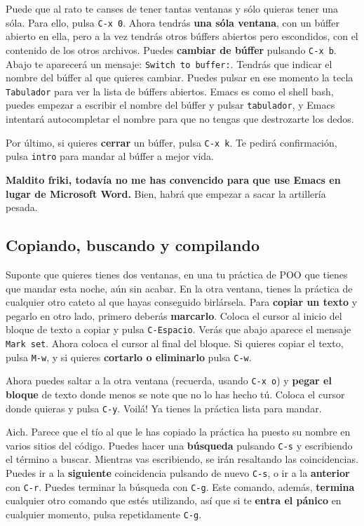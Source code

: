 \documentclass[landscape]{article}
\begin{document}
\begin{multicols*}{2}
Puede que al rato te canses de tener tantas ventanas y sólo quieras tener una sóla. Para ello, pulsa \texttt{C-x 0}. Ahora tendrás \textbf{una sóla ventana}, con un búffer abierto en ella, pero a la vez tendrás otros búffers abiertos pero escondidos, con el contenido de los otros archivos. Puedes \textbf{cambiar de búffer} pulsando \texttt{C-x b}. Abajo te aparecerá un mensaje: \texttt{Switch to buffer:}. Tendrás que indicar el nombre del búffer al que quieres cambiar. Puedes pulsar en ese momento la tecla \texttt{Tabulador} para ver la lista de búffers abiertos. Emacs es como el shell bash, puedes empezar a escribir el nombre del búffer y pulsar \texttt{tabulador}, y Emacs intentará autocompletar el nombre para que no tengas que destrozarte los dedos.

Por último, si quieres \textbf{cerrar} un búffer, pulsa \texttt{C-x k}. Te pedirá confirmación, pulsa \texttt{intro} para mandar al búffer a mejor vida.

\textbf{Maldito friki, todavía no me has convencido para que use Emacs en lugar de Microsoft Word.} Bien, habrá que empezar a sacar la artillería pesada.

\vfill
\pagebreak

\subsection*{Copiando, buscando y compilando}
\vspace{-0.4cm}
Suponte que quieres tienes dos ventanas, en una tu práctica de POO que tienes que mandar esta noche, aún sin acabar. En la otra ventana, tienes la práctica de cualquier otro cateto al que hayas conseguido birlársela. Para \textbf{copiar un texto} y pegarlo en otro lado, primero deberás \textbf{marcarlo}. Coloca el cursor al inicio del bloque de texto a copiar y pulsa \texttt{C-Espacio}. Verás que abajo aparece el mensaje \texttt{Mark set}. Ahora coloca el cursor al final del bloque. Si quieres copiar el texto, pulsa \texttt{M-w}, y si quieres \textbf{cortarlo o eliminarlo} pulsa \texttt{C-w}.

Ahora puedes saltar a la otra ventana (recuerda, usando \texttt{C-x o}) y \textbf{pegar el bloque} de texto donde menos se note que no lo has hecho tú. Coloca el cursor donde quieras y pulsa \texttt{C-y}. Voilá! Ya tienes la práctica lista para mandar.

Aich. Parece que el tío al que le has copiado la práctica ha puesto su nombre en varios sitios del código. Puedes hacer una \textbf{búsqueda} pulsando \texttt{C-s} y escribiendo el término a buscar. Mientras vas escribiendo, se irán resaltando las coincidencias. Puedes ir a la \textbf{siguiente} coincidencia pulsando de nuevo \texttt{C-s}, o ir a la \textbf{anterior} con \texttt{C-r}. Puedes terminar la búsqueda con \texttt{C-g}. Este comando, además, \textbf{termina} cualquier otro comando que estés utilizando, así que si te \textbf{entra el pánico} en cualquier momento, pulsa repetidamente \texttt{C-g}.


\end{multicols*}
\end{document}
